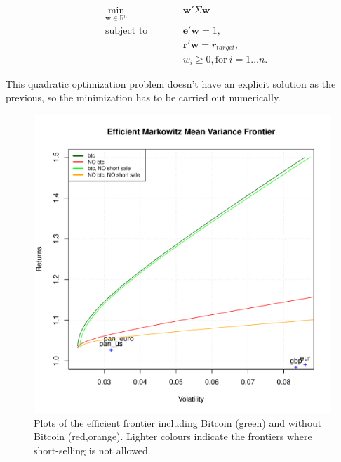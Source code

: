 \documentclass[12pt]{elsarticle}
\begin{document}
\begin{subequations}
\begin{align}
&\!\min_{\mathbf{w}\in \mathbb{R}^{n}}        &\qquad& \mathbf{w} ' \Sigma \mathbf{w} \\
& \text{subject to} &      & \mathbf{e}'\mathbf{w} = 1 ,\label{eq:constraint1}\\
&                  &      & \mathbf{r}'\mathbf{w} = r_{target},\label{eq:constraint2}\\
&		 &        & w_{i} \geq 0, \text{for} \: i = 1\dots n.
\end{align}
\end{subequations}

This quadratic optimization problem doesn't have an explicit solution as the previous, so the minimization has to be carried out numerically.

\begin{figure}[h!]
\includegraphics[width=\textwidth]{frontier_markowitz_all_percentage.pdf}
\caption{Plots of the efficient frontier including Bitcoin (green) and without Bitcoin (red,orange). Lighter colours indicate the frontiers where short-selling is not allowed.}
\end{figure}
\end{document}

